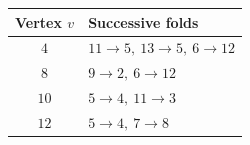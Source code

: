 \begin{tabular}{cl}
\toprule
Vertex \(v\) & Successive folds\\\midrule
\(4\)&\(11\to5,\ 13\to5,\ 6\to12\)\\
\(8\)&\(9\to2,\ 6\to12\)\\
\(10\)&\(5\to4,\ 11\to3\)\\
\(12\)&\(5\to4,\ 7\to8\)\\
\bottomrule
\end{tabular}
